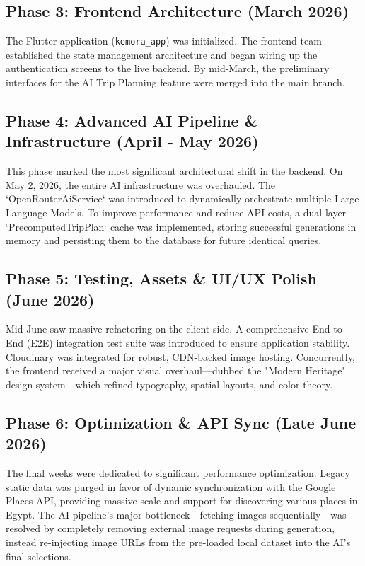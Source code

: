 \subsection{Phase 3: Frontend Architecture (March 2026)}
The Flutter application (\texttt{kemora\_app}) was initialized. The frontend team established the state management architecture and began wiring up the authentication screens to the live backend. By mid-March, the preliminary interfaces for the AI Trip Planning feature were merged into the main branch.

\subsection{Phase 4: Advanced AI Pipeline \& Infrastructure (April - May 2026)}
This phase marked the most significant architectural shift in the backend. On May 2, 2026, the entire AI infrastructure was overhauled. The `OpenRouterAiService` was introduced to dynamically orchestrate multiple Large Language Models. To improve performance and reduce API costs, a dual-layer `PrecomputedTripPlan` cache was implemented, storing successful generations in memory and persisting them to the database for future identical queries.

\subsection{Phase 5: Testing, Assets \& UI/UX Polish (June 2026)}
Mid-June saw massive refactoring on the client side. A comprehensive End-to-End (E2E) integration test suite was introduced to ensure application stability. Cloudinary was integrated for robust, CDN-backed image hosting. Concurrently, the frontend received a major visual overhaul—dubbed the "Modern Heritage" design system—which refined typography, spatial layouts, and color theory.

\subsection{Phase 6: Optimization \& API Sync (Late June 2026)}
The final weeks were dedicated to significant performance optimization. Legacy static data was purged in favor of dynamic synchronization with the Google Places API, providing massive scale and support for discovering various places in Egypt. The AI pipeline's major bottleneck—fetching images sequentially—was resolved by completely removing external image requests during generation, instead re-injecting image URLs from the pre-loaded local dataset into the AI's final selections.

